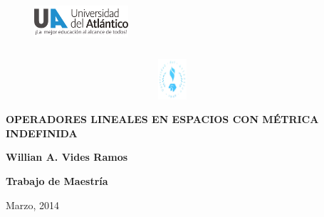 \thispagestyle{empty}


\vspace*{-0.5cm}

\begin{figure}[h]
\includegraphics[width=3.5cm, height=1.5cm]{./ps/logo3}\ \ \ \ \ \ \ \ \ \ \ \ \ \ \ \ \ \ \ \ \ \ \ \ \ \ \ \ \ \ \ \ \ \ \ \ \ \ \ \ \ \ \ \ \ \ \ \ \ \ \ \ \ \ \ \ \ \ \ \ \ \ \ \ \ \ \ \ \ \ \ \ \ \ \ \ \ \ \ \ \
\includegraphics[width=2.5cm, height=1.5cm]{./ps/escudoua}
  \end{figure}

\vspace{3cm}
\begin{center}
\begin{large}
{\bf\large OPERADORES LINEALES EN ESPACIOS CON M\'ETRICA INDEFINIDA}
\end{large}
\end{center}
\vspace{2.5cm}
\begin{center}
\begin{large}
\textbf{Willian A. Vides Ramos}\\
\end{large}
\end{center}



\vspace{2.5cm}

\begin{center}
\textbf{Trabajo de Maestr\'ia}
\end{center}

\vspace{2.5cm}










\begin{center}
 Marzo, 2014
\end{center}

\newpage 